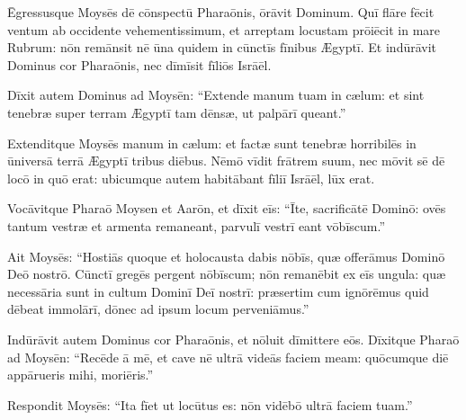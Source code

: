 Ēgressusque Moysēs dē cōnspectū Pharaōnis,
ōrāvit Dominum.  Quī flāre fēcit ventum ab occidente
vehementissimum, et arreptam locustam
prōiēcit in mare Rubrum: nōn remānsit nē ūna quidem in cūnctīs fīnibus
Ægyptī.  Et indūrāvit Dominus cor Pharaōnis, nec dīmīsit fīliōs
Isrāēl.  

Dīxit autem Dominus ad Moysēn: ``Extende manum
tuam in cælum: et sint tenebræ super terram Ægyptī tam
dēnsæ, ut palpārī queant.''

Extenditque
Moysēs manum in cælum: et factæ sunt tenebræ horribilēs in
ūniversā terrā Ægyptī tribus diēbus.  Nēmō vīdit frātrem suum, nec mōvit
sē dē locō in quō erat: ubicumque autem habitābant fīliī
Isrāēl, lūx erat.

Vocāvitque Pharaō Moysen et Aarōn, et dīxit eīs: ``Īte,
sacrificātē Dominō: ovēs tantum vestræ et armenta
remaneant, parvulī vestrī eant vōbīscum.''

Ait Moysēs: ``Hostiās quoque et
holocausta dabis nōbīs, quæ offerāmus Dominō Deō nostrō. 
Cūnctī gregēs pergent nōbīscum; nōn remanēbit ex eīs
ungula: quæ necessāria sunt in cultum Dominī Deī nostrī:
præsertim cum ignōrēmus quid dēbeat
immolārī, dōnec ad ipsum locum
perveniāmus.''

Indūrāvit autem Dominus cor Pharaōnis, et nōluit dīmittere
eōs.  Dīxitque Pharaō ad Moysēn: ``Recēde ā mē, et cave nē ultrā videās
faciem meam: quōcumque diē appārueris mihi, moriēris.''

Respondit Moysēs: ``Ita fīet ut locūtus es: nōn vidēbō ultrā faciem tuam.''
